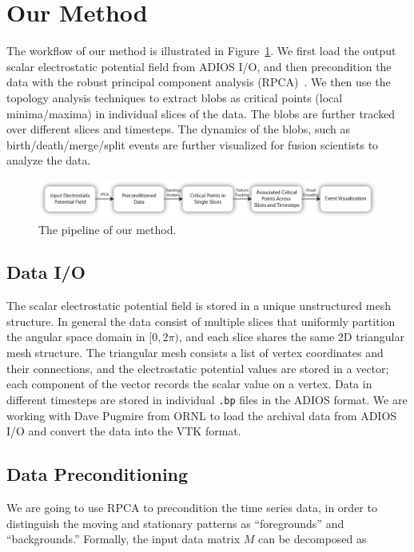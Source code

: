 \section{Our Method}
\label{sec:method}

The workflow of our method is illustrated in Figure~\ref{fig:pipeline}.  
We first load the output scalar electrostatic potential field from ADIOS I/O, and then precondition the data with the robust principal component analysis (RPCA)~\cite{CandesLMW11}.  We then use the topology analysis techniques to extract blobs as critical points (local minima/maxima) in individual slices of the data.  The blobs are further tracked over different slices and timesteps.  The dynamics of the blobs, such as birth/death/merge/split events are further visualized for fusion scientists to analyze the data.  

\begin{figure}[!h]
  \centering
  \includegraphics[width=\linewidth]{Figs/pipeline}
  \caption{The pipeline of our method.}
  \label{fig:pipeline}
\end{figure}


\subsection{Data I/O}

The scalar electrostatic potential field is stored in a unique unstructured mesh structure.  In general the data consist of multiple slices that uniformly partition the angular space domain in $[0, 2\pi)$, and each slice shares the same 2D triangular mesh structure.  The triangular mesh consists a list of vertex coordinates and their connections, and the electrostatic potential values are stored in a vector; each component of the vector records the scalar value on a vertex.  Data in different timesteps are stored in individual \texttt{.bp} files in the ADIOS format.  We are working with Dave Pugmire from ORNL to load the archival data from ADIOS I/O and convert the data into the VTK format.  


\subsection{Data Preconditioning}
We are going to use RPCA to precondition the time series data, in order to distinguish the moving and stationary patterns as ``foregrounds'' and ``backgrounds.''  Formally, the input data matrix $M$ can be decomposed as 

